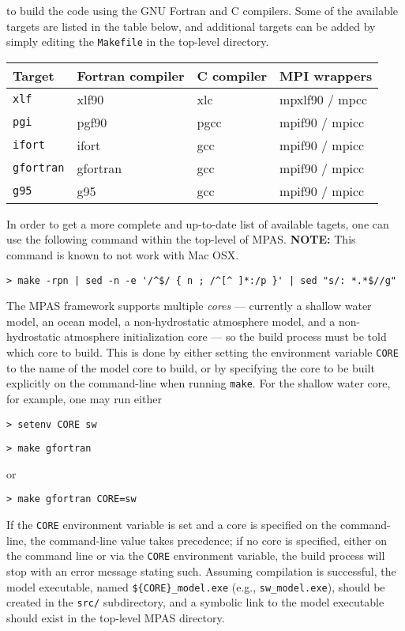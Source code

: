 \noindent to build the code using the GNU Fortran and C compilers. Some of the available targets are listed in the table below, and additional
targets can be added by simply editing the {\tt Makefile} in the top-level directory.

\vspace{12pt}
\begin{longtable}{| l | l | l | l |}
\hline
Target & Fortran compiler & C compiler & MPI wrappers \\ \hline \hline
{\tt xlf} & xlf90 & xlc & mpxlf90 / mpcc \\ \hline
{\tt pgi} & pgf90 & pgcc & mpif90 / mpicc \\ \hline
{\tt ifort} & ifort & gcc & mpif90 / mpicc \\ \hline
{\tt gfortran} & gfortran & gcc & mpif90 / mpicc \\ \hline
{\tt g95} & g95 & gcc & mpif90 / mpicc \\ \hline
\end{longtable}
\vspace{12pt}

In order to get a more complete and up-to-date list of available tagets, one can use the following command within the top-level of MPAS. {\bf NOTE: }This command is known to not work with Mac OSX.
{\small
\begin{verbatim}
> make -rpn | sed -n -e '/^$/ { n ; /^[^ ]*:/p }' | sed "s/: *.*$//g"
\end{verbatim}
}

The MPAS framework supports multiple {\em cores} --- currently a shallow water
model, an ocean model, a non-hydrostatic atmosphere model, and a non-hydrostatic atmosphere initialization core --- so the build
process must be told which core to build. This is done by either setting the environment variable
{\tt CORE} to the name of the model core to build, or by specifying the core to be built explicitly on the command-line
when running {\tt make}. For the shallow water core, for example, one may run either

\vspace{12pt}
{\tt > setenv CORE sw}

{\tt > make gfortran}
\vspace{12pt}

\noindent or

\vspace{12pt}
{\tt > make gfortran CORE=sw}
\vspace{12pt}

If the {\tt CORE} environment variable is set and a core is specified on the command-line, the command-line value takes precedence; if no core
is specified, either on the command line or via the {\tt CORE} environment variable, the build process will stop with an error message stating such.
Assuming compilation is successful, the model executable, named {\tt \$\{CORE\}\_model.exe} (e.g., {\tt sw\_model.exe}), should
be created in the {\tt src/} subdirectory, and a symbolic link to the model executable 
should exist in the top-level MPAS directory.

